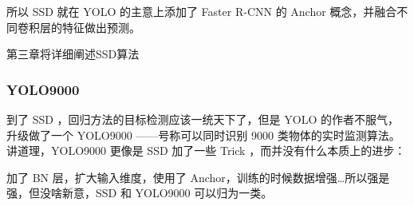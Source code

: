 所以 SSD 就在 YOLO 的主意上添加了 Faster R-CNN 的 Anchor 概念，并融合不同卷积层的特征做出预测。

第三章将详细阐述SSD算法

\subsubsection{YOLO9000}
到了 SSD ，回归方法的目标检测应该一统天下了，但是 YOLO 的作者不服气，升级做了一个 YOLO9000 ——号称可以同时识别 9000 类物体的实时监测算法。讲道理，YOLO9000 更像是 SSD 加了一些 Trick ，而并没有什么本质上的进步：

加了 BN 层，扩大输入维度，使用了 Anchor，训练的时候数据增强…所以强是强，但没啥新意，SSD 和 YOLO9000 可以归为一类。

